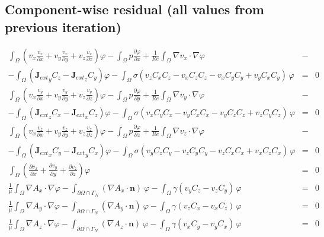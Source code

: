 \documentclass[smallextended]{svjour3}       %
\begin{document}
		\subsection{Component-wise residual (all values from previous iteration)}
		\begin{eqnarray}
			\int_{\Omega} \left({v_x} \frac{v_x}{\partial x} + v_y \frac{v_x}{\partial y} + v_z \frac{v_x}{\partial z}\right) \varphi
			- \int_{\Omega} p \frac{\partial \varphi}{\partial x}
			+ \frac{1}{Re} \int_{\Omega} \nabla v_x \cdot \nabla \varphi
			\nonumber & -\\
			- \int_{\Omega} \left({\mathbf{J}_{ext}}_y C_z - {\mathbf{J}_{ext}}_z C_y\right) \varphi			
			- \int_{\Omega} \sigma \left(v_z C_x C_z - v_x C_z C_z - v_x C_y C_y + v_y C_x C_y\right)\, \varphi
			& = & 0\nonumber \\
			\int_{\Omega} \left(v_x \frac{v_y}{\partial x} + v_y \frac{v_y}{\partial y} + v_z \frac{v_y}{\partial z}\right) \varphi
			- \int_{\Omega} p \frac{\partial \varphi}{\partial y}
			+ \frac{1}{Re} \int_{\Omega} \nabla v_y \cdot \nabla \varphi
			\nonumber & -\\
			- \int_{\Omega} \left({\mathbf{J}_{ext}}_z C_x - {\mathbf{J}_{ext}}_x C_z\right) \varphi			
			- \int_{\Omega} \sigma \left(v_x C_y C_x - v_y C_x C_x - v_y C_z C_z + v_z C_y C_z\right)\, \varphi
			& = & 0\nonumber \\
			\int_{\Omega} \left(v_x \frac{v_z}{\partial x} + v_y \frac{v_z}{\partial y} + v_z \frac{v_z}{\partial z}\right) \varphi
			- \int_{\Omega} p \frac{\partial \varphi}{\partial z}
			+ \frac{1}{Re} \int_{\Omega} \nabla v_z \cdot \nabla \varphi
			\nonumber & -\\
			- \int_{\Omega} \left({\mathbf{J}_{ext}}_x C_y - {\mathbf{J}_{ext}}_y C_x\right) \varphi			
			- \int_{\Omega} \sigma \left(v_y C_z C_y - v_z C_y C_y - v_z C_x C_x + v_x C_z C_x\right)\, \varphi
			& = & 0\nonumber \\			
			\int_{\Omega} \left(\frac{\partial v_x}{\partial x} + \frac{\partial v_y}{\partial y} + \frac{\partial v_z}{\partial z}\right) \varphi & = & 0\nonumber \\
			\frac{1}{\mu}\int_{\Omega}\nabla A_x \cdot \nabla \varphi - \int_{\partial \Omega \cap \Gamma_{N}} \left(\nabla A_x\cdot \mathbf{n}\right)\ \varphi 
			 - \int_{\Omega} \gamma \left(v_y C_z - v_z C_y\right)\,\varphi & = & 0\nonumber \\
			\frac{1}{\mu}\int_{\Omega}\nabla A_y \cdot \nabla \varphi - \int_{\partial \Omega \cap \Gamma_{N}} \left(\nabla A_y\cdot \mathbf{n}\right)\ \varphi 
			 - \int_{\Omega} \gamma \left(v_z C_x - v_x C_z\right)\,\varphi & = & 0\nonumber \\
			\frac{1}{\mu}\int_{\Omega}\nabla A_z \cdot \nabla \varphi - \int_{\partial \Omega \cap \Gamma_{N}} \left(\nabla A_z\cdot \mathbf{n}\right)\ \varphi 
			 - \int_{\Omega} \gamma \left(v_x C_y - v_y C_x\right)\,\varphi & = & 0\nonumber \\
			 \nonumber 
		\end{eqnarray}
\end{document}
